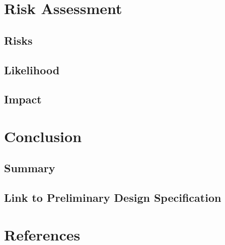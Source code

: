\documentclass[]{report}
\begin{document}
\chapter{Risk Assessment}

\section{Risks}

\section{Likelihood}

\section{Impact}

\chapter{Conclusion}

\section{Summary}

\section{Link to Preliminary Design Specification}

\chapter*{References}
\end{document}

